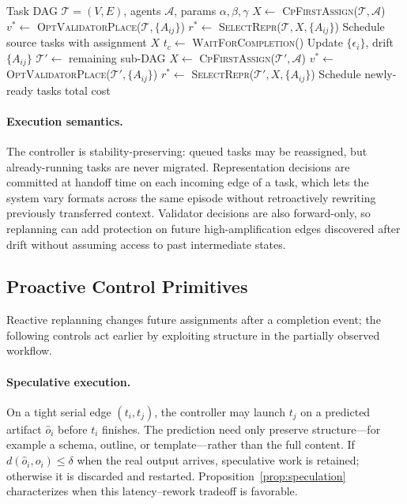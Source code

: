 \documentclass[10pt, twocolumn]{article}
\begin{document}
\begin{algorithm}[t]
\caption{Adaptive Multi-Agent Orchestration}
\label{alg:adaptive}
\begin{algorithmic}[1]
\REQUIRE Task DAG $\mathcal{T}=(V,E)$, agents $\mathcal{A}$, params $\alpha, \beta, \gamma$
\STATE $X \leftarrow$ \textsc{CpFirstAssign}($\mathcal{T}, \mathcal{A}$)
\STATE $v^* \leftarrow$ \textsc{OptValidatorPlace}($\mathcal{T}, \{A_{ij}\}$)
\STATE $r^* \leftarrow$ \textsc{SelectRepr}($\mathcal{T}, X, \{A_{ij}\}$)
\STATE Schedule source tasks with assignment $X$
    \STATE $t_c \leftarrow$ \textsc{WaitForCompletion}()
    \STATE Update $\{\epsilon_i\}$, drift $\{A_{ij}\}$
    \STATE $\mathcal{T}' \leftarrow$ remaining sub-DAG
    \STATE $X \leftarrow$ \textsc{CpFirstAssign}($\mathcal{T}', \mathcal{A}$)
    \STATE $v^* \leftarrow$ \textsc{OptValidatorPlace}($\mathcal{T}', \{A_{ij}\}$)
    \STATE $r^* \leftarrow$ \textsc{SelectRepr}($\mathcal{T}', X, \{A_{ij}\}$)
    \STATE Schedule newly-ready tasks
\ENDWHILE
\RETURN total cost
\end{algorithmic}
\end{algorithm}

\paragraph{Execution semantics.}
The controller is stability-preserving: queued tasks may be reassigned, but already-running tasks are never migrated. Representation decisions are committed at handoff time on each incoming edge of a task, which lets the system vary formats across the same episode without retroactively rewriting previously transferred context. Validator decisions are also forward-only, so replanning can add protection on future high-amplification edges discovered after drift without assuming access to past intermediate states.

\subsection{Proactive Control Primitives}

Reactive replanning changes future assignments after a completion event; the following controls act earlier by exploiting structure in the partially observed workflow.

\paragraph{Speculative execution.}
On a tight serial edge $(t_i, t_j)$, the controller may launch $t_j$ on a predicted artifact $\hat{o}_i$ before $t_i$ finishes. The prediction need only preserve structure---for example a schema, outline, or template---rather than the full content. If $d(\hat{o}_i, o_i) \leq \delta$ when the real output arrives, speculative work is retained; otherwise it is discarded and restarted. Proposition~\ref{prop:speculation} characterizes when this latency--rework tradeoff is favorable.
\end{document}
